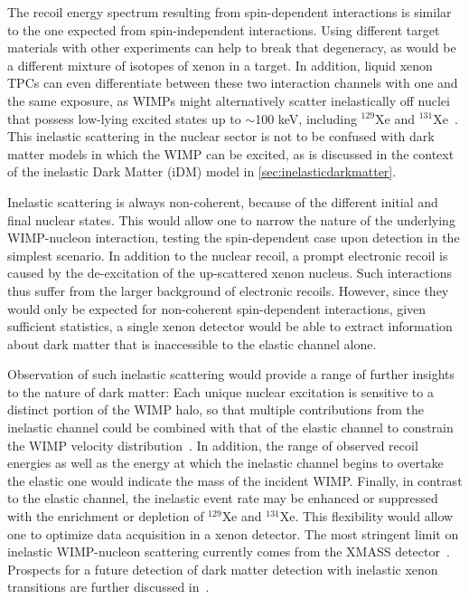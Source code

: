 The recoil energy spectrum resulting from spin-dependent interactions is similar to the one expected from spin-independent interactions. Using different target materials with other experiments can help to break that degeneracy, as would be a different mixture of isotopes of xenon in a target. In addition, liquid xenon TPCs can even differentiate between these two interaction channels with one and the same exposure, as WIMPs might alternatively scatter inelastically off nuclei that possess low-lying excited states up to $\sim$100 keV, including $^{129}$Xe and $^{131}$Xe~\cite{Baudis:2013bba,Aprile:2017ngb,Aprile:2020sfu}. This inelastic scattering in the nuclear sector is not to be confused with dark matter models in which the WIMP can be excited, as is discussed in the context of the inelastic Dark Matter (iDM) model in \autoref{sec:inelasticdarkmatter}. 

Inelastic scattering is always non-coherent, because of the different initial and final nuclear states. This would allow one to narrow the nature of the underlying WIMP-nucleon interaction, testing the spin-dependent case upon detection in the simplest scenario. In addition to the nuclear recoil, a prompt electronic recoil is caused by the de-excitation of the up-scattered xenon nucleus. Such interactions thus suffer from the larger background of electronic recoils. However, since they would only be expected for non-coherent spin-dependent interactions, given sufficient statistics, a single xenon detector would be able to extract information about dark matter that is inaccessible to the elastic channel alone. 

Observation of such inelastic scattering would provide a range of further insights to the nature of dark matter: Each unique nuclear excitation is sensitive to a distinct portion of the WIMP halo, so that multiple contributions from the inelastic channel could be combined with that of the elastic channel to constrain the WIMP velocity distribution~\cite{Baudis:2013bba}. In addition, the range of observed recoil energies as well as the energy at which the inelastic channel begins to overtake the elastic one would indicate the mass of the incident WIMP. Finally, in contrast to the elastic channel, the inelastic event rate may be enhanced or suppressed with the enrichment or depletion of $^{129}$Xe and $^{131}$Xe. This flexibility would allow one to optimize data acquisition in a xenon detector. The most stringent limit on inelastic WIMP-nucleon scattering currently comes from the XMASS detector~\cite{Suzuki:2019ine}. Prospects for a future detection of dark matter detection with inelastic xenon transitions are further discussed in~\cite{McCabe:2015eia}.

